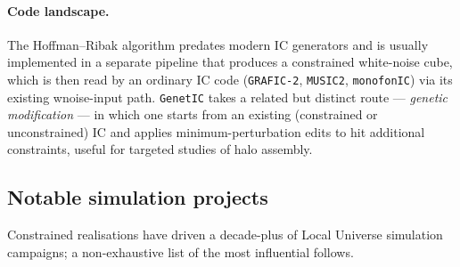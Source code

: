 \documentclass[12pt]{article}
\begin{document}
\paragraph{Code landscape.}
The Hoffman--Ribak algorithm predates modern IC generators and is
usually implemented in a separate pipeline that produces a constrained
white-noise cube, which is then read by an ordinary IC code
(\texttt{GRAFIC-2}, \texttt{MUSIC2}, \texttt{monofonIC}) via its
existing wnoise-input path.  \texttt{GenetIC} \citep{Stopyra2021}
takes a related but distinct route --- \emph{genetic modification}
--- in which one starts from an existing (constrained or
unconstrained) IC and applies minimum-perturbation edits to hit
additional constraints, useful for targeted studies of halo assembly.

\subsection{Notable simulation projects}
\label{sec:cr_projects}

Constrained realisations have driven a decade-plus of Local Universe
simulation campaigns; a non-exhaustive list of the most influential
follows.
\end{document}
